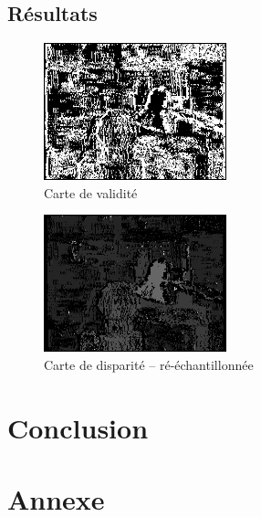 \documentclass[a4paper]{article}
\begin{document}
\subsection{Résultats}

\begin{figure}[h]
\begin{center}
	\includegraphics[width=200px]{validity-mask.png}
\end{center}
\caption{Carte de validité}
\end{figure}

\begin{figure}[h]
\begin{center}
	\includegraphics[width=200px]{disparity_resampled.png}
\end{center}
\caption{Carte de disparité -- ré-échantillonnée}
\end{figure}

\clearpage


\section{Conclusion}

\clearpage

\section{Annexe}
\end{document}
